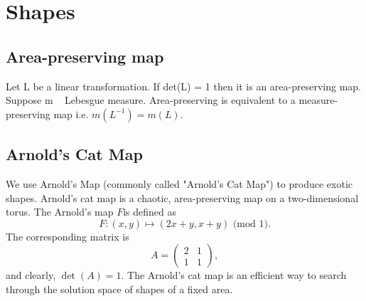 \documentclass[12pt]{article}
\begin{document}
\section{Shapes}
\subsection{Area-preserving map}
Let L be a linear transformation.
If det(L) = 1 then it is an area-preserving map.
Suppose m ~ Lebesgue measure.
Area-preserving is equivalent to a measure-preserving map
i.e. $m(L^{-1}) = m(L)$.

\subsection{Arnold's Cat Map}
We use Arnold's Map (commonly called "Arnold's Cat Map") to produce exotic shapes.
Arnold's cat map is a chaotic, area-preserving map on a two-dimensional torus.
\citep{hilborn}
The Arnold's map $F$is defined as
\begin{equation*}
  F: (x,y) \mapsto (2x + y, x + y) \mbox{ (mod 1)}.
\end{equation*}
The corresponding matrix is
\begin{equation*}
A =
\begin{pmatrix}
    2 & 1  \\
    1 & 1  
  \end{pmatrix},
\end{equation*}
and clearly, $\det(A) = 1$.
The Arnold's cat map is an efficient way to search through the solution space of shapes of a fixed area.
\end{document}
